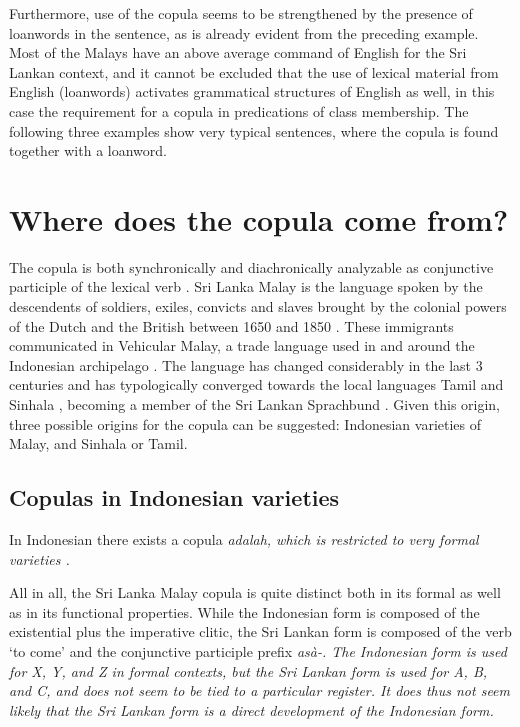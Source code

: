 \documentclass[a4paper,12pt]{article}
\begin{document}
Furthermore, use of the copula seems to be strengthened by the presence of loanwords in the sentence, as is already evident from the preceding example. Most of the Malays have an above average command of English for the Sri Lankan context, and it cannot be excluded that the use of lexical material from English (loanwords) activates grammatical structures of English as well, in this case the requirement for a copula in predications of class membership. The following three examples show very typical sentences, where the copula is found together with a loanword.

\section{Where does the copula come from?}
The copula is both synchronically and diachronically analyzable as conjunctive participle of the lexical verb . Sri Lanka Malay is the language spoken by the descendents of soldiers, exiles, convicts and slaves brought by the colonial powers of the Dutch and the British between 1650 and 1850 \citep{Bichsel,Hussainmiya1990,Nordhoff2009phd}. These immigrants communicated in Vehicular Malay, a trade language used in and around the Indonesian archipelago \citep{Smith2003timing, SmithEtAl2004}. The language has changed considerably in the last 3 centuries and has typologically converged towards the local languages Tamil and Sinhala \citep{SmithEtAl2004, SmithEtAl2006cll, Ansaldo2005ms, Ansaldo2008genesis,Nordhoff2009phd}, becoming a member of the Sri Lankan Sprachbund \citep{Bakker2006}. Given this origin, three possible origins for the copula can be suggested: Indonesian varieties of Malay, and Sinhala or Tamil.

\subsection{Copulas in Indonesian varieties}
In Indonesian there exists a copula \em adalah\em, which is restricted to very formal varieties \citep[235]{Ewing2005}.

All in all, the Sri Lanka Malay copula is quite distinct both in its formal as well as in its functional properties. While the Indonesian form is composed of the existential plus the imperative clitic, the Sri Lankan form is composed of the verb `to come' and the conjunctive participle prefix \em asà-\em.  The Indonesian form is used for X, Y, and Z in formal contexts, but the Sri Lankan form is used for A, B, and C, and does not seem to be tied to a particular register. It does thus not seem likely that the Sri Lankan form is a direct development of the Indonesian form.
\end{document}
